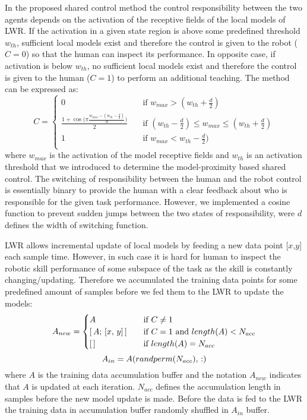 In the proposed shared control method the control responsibility between the two agents depends on the activation of the receptive fields of the local models of LWR. If the activation in a given state region is above some predefined threshold $w_{th}$, sufficient local models exist and therefore the control is given to the robot ($C=0$) so that the human can inspect its performance. In opposite case, if activation is below $w_{th}$, no sufficient local models exist and therefore the control is given to the human ($C=1$) to perform an additional teaching. The method can be expressed as:
\begin{equation}
C = \begin{cases} 0 & \quad \text{if } w_{max} > (w_{th} + \frac{d}{2})
\\ \frac{ 1 + \cos \big(\pi \frac{w_{max} - (w_{th} - \frac{d}{2}) }{d}\big)}{2} & \quad \text{if } (w_{th} - \frac{d}{2}) \leq w_{max} \leq (w_{th} + \frac{d}{2})
\\ 1 & \quad \text{if } w_{max} < w_{th} - \frac{d}{2}) \\ \end{cases}
\label{eq:factor}
\end{equation}
where $w_{max}$ is the activation of the model receptive fields \cite{Schaal1998} and $w_{th}$ is an activation threshold that we introduced to determine the model-proximity based shared control. The switching of responsibility between the human and the robot control is essentially binary to provide the human with a clear feedback about who is responsible for the given task performance. However, we implemented a cosine function to prevent sudden jumps between the two states of responsibility, were $d$ defines the width of switching function.

LWR allows incremental update of local models by feeding a new data point [$x$,$y$] each sample time. However, in such case it is hard for human to inspect the robotic skill performance of some subspace of the task as the skill is constantly changing/updating. Therefore we accumulated the training data points for some predefined amount of samples before we fed them to the LWR to update the models:
\begin{equation}
A_{new} = \begin{cases} A & \quad \text{if } C \neq 1
\\ [\thinspace A; \thinspace [x, \thinspace y]\thinspace ] & \quad \text{if } C = 1 \text{ and } length(A) < N_{acc}
\\ [\thinspace] & \quad \text{if } length(A) = N_{acc} \\ \end{cases}
\label{eq:accumulate}
\end{equation}
\begin{equation}
A_{in} = A(randperm(N_{acc}),\thinspace :)
\label{eq:shuffle}
\end{equation}
where $A$ is the training data accumulation buffer and the notation $A_{new}$ indicates that $A$ is updated at each iteration. $N_{acc}$ defines the accumulation length in samples before the new model update is made. Before the data is fed to the LWR the training data in accumulation buffer randomly shuffled in $A_{in}$ buffer.

